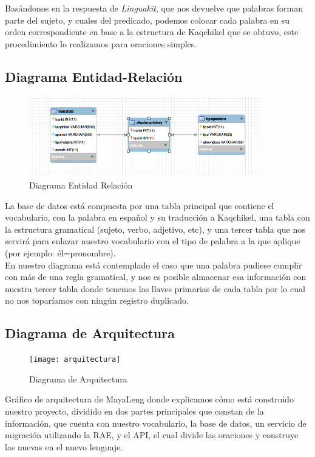 \documentclass[a4paper,openright,11pt]{article}
\begin{document}
Basándonos en la respuesta de \textit{Linguakit}, que nos devuelve que palabras forman parte del sujeto, y cuales del predicado, podemos colocar cada palabra en su orden correspondiente en base a la estructura de Kaqchikel que se obtuvo, este procedimiento lo realizamos para oraciones simples.

\subsection{Diagrama Entidad-Relación}
\begin{figure}[h]
	\centering
	\includegraphics[width=0.9\textwidth]{er}
	\caption{Diagrama Entidad Relación}
	\label{fig:er}
\end{figure}
La base de datos está compuesta por una tabla principal que contiene el vocabulario, con la palabra en español y su traducción a Kaqchikel, una tabla con la estructura gramatical (sujeto, verbo, adjetivo, etc), y una tercer tabla que nos servirá para enlazar nuestro vocabulario con el tipo de palabra a la que aplique (por ejemplo: él=pronombre).\\
En nuestro diagrama está contemplado el caso que una palabra pudiese cumplir con más de una regla gramatical, y nos es posible almacenar esa información con nuestra tercer tabla donde tenemos las llaves primarias de cada tabla por lo cual no nos toparíamos con ningún registro duplicado.

\subsection{Diagrama de Arquitectura}
\begin{figure}[h]
	\centering
	\texttt{[image: arquitectura]}
	\caption{Diagrama de Arquitectura}
	\label{fig:arq}
\end{figure}
Gráfico de arquitectura de MayaLeng donde explicamos cómo está construido nuestro proyecto, dividido en dos partes principales que constan de la información, que cuenta con nuestro vocabulario, la base de datos, un servicio de migración utilizando la RAE, y el API, el cual divide las oraciones y construye las nuevas en el nuevo lenguaje.
\end{document}
